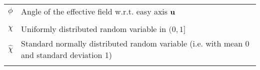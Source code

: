\begin{longtable}[l]{p{60pt} p{350pt}}


	$\phi$ & Angle of the effective field w.r.t. easy axis $\boldsymbol{\mathbf{u}}$ \\
	&\\

	$\chi$ & Uniformly distributed random variable in $(0, 1]$ \\
	$\hat{\chi}$ & Standard normally distributed random variable (i.e. with mean 0 and standard deviation 1) \\
	&\\
\end{longtable}
